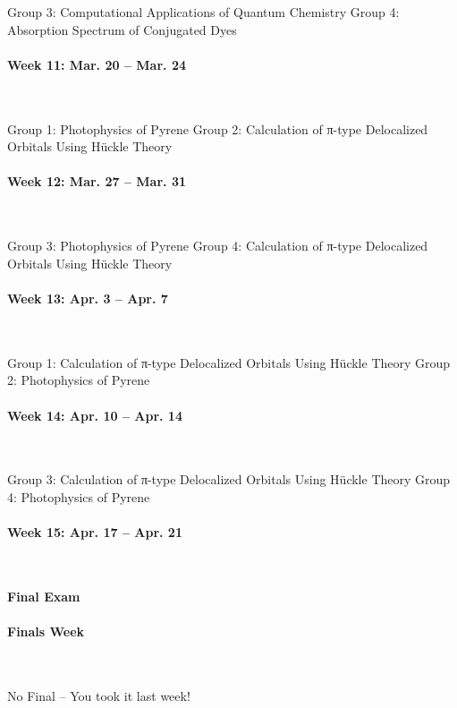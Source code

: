 \documentclass[12pt, letterpaper]{article}
\begin{document}
Group 3: Computational Applications of Quantum Chemistry
Group 4: Absorption Spectrum of Conjugated Dyes

\paragraph{Week 11: Mar. 20 -- Mar. 24}~

Group 1: Photophysics of Pyrene
Group 2: Calculation of π-type Delocalized Orbitals Using Hückle Theory

\paragraph{Week 12: Mar. 27 -- Mar. 31}~

Group 3: Photophysics of Pyrene
Group 4: Calculation of π-type Delocalized Orbitals Using Hückle Theory

\paragraph{Week 13: Apr. 3 -- Apr. 7}~

Group 1: Calculation of π-type Delocalized Orbitals Using Hückle Theory
Group 2: Photophysics of Pyrene

\paragraph{Week 14: Apr. 10 -- Apr. 14}~

Group 3: Calculation of π-type Delocalized Orbitals Using Hückle Theory
Group 4: Photophysics of Pyrene

\paragraph{Week 15: Apr. 17 -- Apr. 21}~

\textbf{Final Exam}

\paragraph{Finals Week}~

No Final -- You took it last week!
\end{document}
